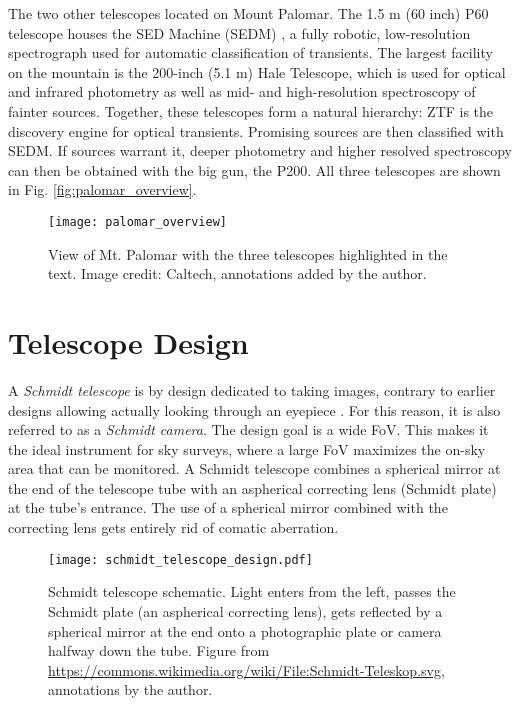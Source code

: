 The two other telescopes located on Mount Palomar. The 1.5 m (60 inch) P60 telescope houses the SED Machine (SEDM) , a fully robotic, low-resolution spectrograph used for automatic classification of transients. The largest facility on the mountain is the 200-inch (5.1 m) Hale Telescope, which is used for optical and infrared photometry as well as mid- and high-resolution spectroscopy of fainter sources. Together, these telescopes form a natural hierarchy: ZTF is the discovery engine for optical transients. Promising sources are then classified with SEDM. If sources warrant it, deeper photometry and higher resolved spectroscopy can then be obtained with the big gun, the P200. All three telescopes are shown in Fig. \ref{fig:palomar_overview}.

\begin{figure*}[]
    \texttt{[image: palomar\_overview]}
    \caption[View of Mt. Palomar]{View of Mt. Palomar with the three telescopes highlighted in the text. Image credit: Caltech, annotations added by the author.}
\end{figure*}

\section{Telescope Design}
A \textit{Schmidt telescope} is by design dedicated to taking images, contrary to earlier designs allowing actually looking through an eyepiece . For this reason, it is also referred to as a \textit{Schmidt camera}. The design goal is a wide FoV. This makes it the ideal instrument for sky surveys, where a large FoV maximizes the on-sky area that can be monitored. A Schmidt telescope combines a spherical mirror at the end of the telescope tube with an aspherical correcting lens (Schmidt plate) at the tube's entrance. The use of a spherical mirror combined with the correcting lens gets entirely rid of comatic aberration.

\begin{figure}[]
    \texttt{[image: schmidt\_telescope\_design.pdf]}
    \caption[Schmidt telescope schematic]{Schmidt telescope schematic. Light enters from the left, passes the Schmidt plate (an aspherical correcting lens), gets reflected by a spherical mirror at the end onto a photographic plate or camera halfway down the tube. Figure from \url{https://commons.wikimedia.org/wiki/File:Schmidt-Teleskop.svg}, annotations by the author.}
\end{figure}

